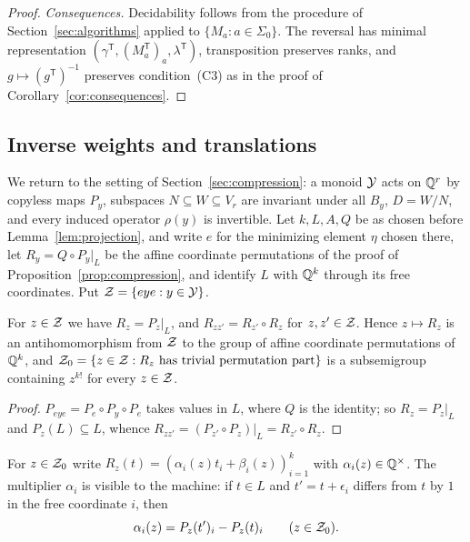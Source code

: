 \begin{proof}
\emph{Consequences.} Decidability follows from the procedure of Section~\ref{sec:algorithms} applied to $\{M_a:a\in\Sigma_0\}$. The reversal has minimal representation $(\gamma^{\mathsf T},(M_a^{\mathsf T})_a,\lambda^{\mathsf T})$, transposition preserves ranks, and $g\mapsto(g^{\mathsf T})^{-1}$ preserves condition~(C3) as in the proof of Corollary~\ref{cor:consequences}.
\end{proof}

\subsection{Inverse weights and translations}
We return to the setting of Section~\ref{sec:compression}: a monoid $\mathcal{Y}$ acts on $\mathbb{Q}^r$ by copyless maps $P_y$, subspaces $N\subseteq W\subseteq V_r$ are invariant under all $B_y$, $D=W/N$, and every induced operator $\rho(y)$ is invertible. Let $k,L,A,Q$ be as chosen before Lemma~\ref{lem:projection}, and write $e$ for the minimizing element $\eta$ chosen there, let $R_y=Q\circ P_y|_L$ be the affine coordinate permutations of the proof of Proposition~\ref{prop:compression}, and identify $L$ with $\mathbb{Q}^k$ through its free coordinates. Put $\mathcal{Z}=\{eye:y\in\mathcal{Y}\}$.

\begin{lemma}\label{lem:Zhom}
For $z\in\mathcal{Z}$ we have $R_z=P_z|_L$, and $R_{zz'}=R_{z'}\circ R_z$ for $z,z'\in\mathcal{Z}$. Hence $z\mapsto R_z$ is an antihomomorphism from $\mathcal{Z}$ to the group of affine coordinate permutations of $\mathbb{Q}^k$, and $\mathcal{Z}_0=\{z\in\mathcal{Z}:R_z\text{ has trivial permutation part}\}$ is a subsemigroup containing $z^{k!}$ for every $z\in\mathcal{Z}$.
\end{lemma}
\begin{proof}
$P_{eye}=P_e\circ P_y\circ P_e$ takes values in $L$, where $Q$ is the identity; so $R_z=P_z|_L$ and $P_z(L)\subseteq L$, whence $R_{zz'}=(P_{z'}\circ P_z)|_L=R_{z'}\circ R_z$.
\end{proof}

For $z\in\mathcal{Z}_0$ write $R_z(t)=(\alpha_i(z)t_i+\beta_i(z))_{i=1}^k$ with $\alpha_i(z)\in\mathbb{Q}^\times$. The multiplier $\alpha_i$ is visible to the machine: if $t\in L$ and $t'=t+\epsilon_i$ differs from $t$ by $1$ in the free coordinate $i$, then
\begin{equation}\label{eq:multiplier}
\alpha_i(z)=P_z(t')_i-P_z(t)_i\qquad(z\in\mathcal{Z}_0).
\end{equation}

